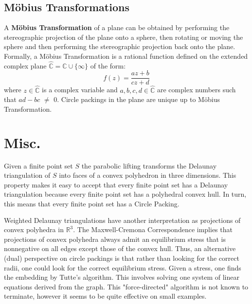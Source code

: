 \documentclass[11pt]{article}
\newcommand{\R}{\mathbb{R}}
\newcommand{\C}{\mathbb{C}}
\newcommand{\CP}{\hat{\mathbb{C}}}
\begin{document}
\subsection{M\"{o}bius Transformations}
 A \textbf{M\"{o}bius Transformation} of a plane can be obtained by performing the stereographic projection of the plane onto a sphere, then rotating or moving the sphere and then performing the stereographic projection back onto the plane. 
  Formally, a M\"{o}bius Transformation is a rational function defined on the extended complex plane $\CP = \C\cup\{\infty\}$ of the form:
  \begin{equation} 
  	f(z) = \frac{az+b}{cz+d}
  \end{equation}
  where $z\in\CP$ is a complex variable and $a,b,c,d\in\CP$ are complex numbers such that $ad - bc$ $\neq$ $0$.
  Circle packings in the plane are unique up to M\"{o}bius Transformation.

\section{Misc.}
Given a finite point set $S$ the parabolic lifting transforms the Delaunay triangulation of $S$ into faces of a convex polyhedron in three dimensions. This property makes it easy to accept that every finite point set has a Delaunay triangulation because every finite point set has a polyhedral convex hull. In turn, this means that every finite point set has a Circle Packing.


    Weighted Delaunay triangulations have another interpretation as projections of convex polyhedra in $\R^3$. The Maxwell-Cremona Correspondence implies that projections of convex polyhedra always admit an equilibrium stress that is nonnegative on all edges except those of the convex hull. Thus, an alternative (dual) perspective on circle packings is that rather than looking for the correct radii, one could look for the correct equilibrium stress. Given a stress, one finds the embedding by Tutte's algorithm. This involves solving one system of linear equations derived from the graph. This "force-directed" algorithm is not known to terminate, however it seems to be quite effective on small examples. 


\end{document}
